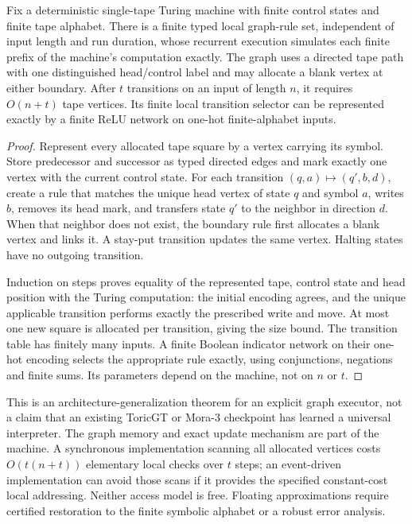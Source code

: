 \begin{theorem}
Fix a deterministic single-tape Turing machine with finite control states and finite tape alphabet. There is a finite typed local graph-rule set, independent of input length and run duration, whose recurrent execution simulates each finite prefix of the machine's computation exactly. The graph uses a directed tape path with one distinguished head/control label and may allocate a blank vertex at either boundary. After $t$ transitions on an input of length $n$, it requires $O(n+t)$ tape vertices. Its finite local transition selector can be represented exactly by a finite ReLU network on one-hot finite-alphabet inputs.
\end{theorem}
\begin{proof}
Represent every allocated tape square by a vertex carrying its symbol. Store predecessor and successor as typed directed edges and mark exactly one vertex with the current control state. For each transition $(q,a)\mapsto(q',b,d)$, create a rule that matches the unique head vertex of state $q$ and symbol $a$, writes $b$, removes its head mark, and transfers state $q'$ to the neighbor in direction $d$. When that neighbor does not exist, the boundary rule first allocates a blank vertex and links it. A stay-put transition updates the same vertex. Halting states have no outgoing transition.

Induction on steps proves equality of the represented tape, control state and head position with the Turing computation: the initial encoding agrees, and the unique applicable transition performs exactly the prescribed write and move. At most one new square is allocated per transition, giving the size bound. The transition table has finitely many inputs. A finite Boolean indicator network on their one-hot encoding selects the appropriate rule exactly, using conjunctions, negations and finite sums. Its parameters depend on the machine, not on $n$ or $t$.
\end{proof}

This is an architecture-generalization theorem for an explicit graph executor, not a claim that an existing ToricGT or Mora-3 checkpoint has learned a universal interpreter. The graph memory and exact update mechanism are part of the machine. A synchronous implementation scanning all allocated vertices costs $O(t(n+t))$ elementary local checks over $t$ steps; an event-driven implementation can avoid those scans if it provides the specified constant-cost local addressing. Neither access model is free. Floating approximations require certified restoration to the finite symbolic alphabet or a robust error analysis.

